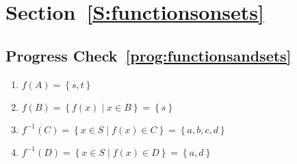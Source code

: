 \section*{Section~\ref{S:functionsonsets}}

\subsection*{Progress Check~\ref{prog:functionsandsets}}
\begin{multicols}{2}
\begin{enumerate}
\item $f ( A ) = \left\{ s, t \right\}$
\item $f ( B ) = \left\{ f ( x ) \mid x \in B \right\} = \left\{ s \right\}$
\end{enumerate}
\end{multicols}

\begin{enumerate} \setcounter{enumi}{2}
\item $f^{-1} ( C ) = \left\{ x \in S \mid f ( x ) \in C \right\} = 
                                 \left\{ a, b, c, d \right\}$
\item $f^{-1} ( D ) = \left\{ x \in S \mid f ( x ) \in D \right\} = 
                                 \left\{ a, d \right\}$
\end{enumerate}




